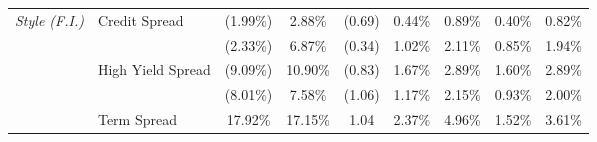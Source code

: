 \documentclass[12pt]{article}
\begin{document}
\begin{table}[H]
{\begin{tabular}{@{}llccccccc@{}}
\textit{Style (F.I.)}         & Credit Spread     & (1.99\%)                                                         & 2.88\%                                                               & (0.69)                                                 & 0.44\%                                                        & 0.89\%                                                       & 0.40\%                                                        & 0.82\%                                                      \\
\textit{}                     &                   & {\color[HTML]{303498} (2.33\%)}                                  & {\color[HTML]{303498} 6.87\%}                                        & {\color[HTML]{303498} (0.34)}                          & {\color[HTML]{303498} 1.02\%}                                 & {\color[HTML]{303498} 2.11\%}                                & {\color[HTML]{303498} 0.85\%}                                 & {\color[HTML]{303498} 1.94\%}                               \\
                              & High Yield Spread & (9.09\%)                                                         & 10.90\%                                                              & (0.83)                                                 & 1.67\%                                                        & 2.89\%                                                       & 1.60\%                                                        & 2.89\%                                                      \\
                              &                   & {\color[HTML]{303498} (8.01\%)}                                  & {\color[HTML]{303498} 7.58\%}                                        & {\color[HTML]{303498} (1.06)}                          & {\color[HTML]{303498} 1.17\%}                                 & {\color[HTML]{303498} 2.15\%}                                & {\color[HTML]{303498} 0.93\%}                                 & {\color[HTML]{303498} 2.00\%}                               \\
                              & Term Spread       & 17.92\%                                                          & 17.15\%                                                              & 1.04                                                   & 2.37\%                                                        & 4.96\%                                                       & 1.52\%                                                        & 3.61\%                                                      \\

\end{tabular}}
\end{table}
\end{document}
